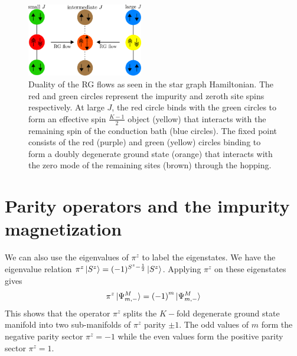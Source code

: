 \documentclass[12pt]{revtex4-2}
\begin{document}
\begin{figure}[htpb]
	\centering
	\includegraphics[width=0.45\textwidth]{./duality.pdf}
	\caption{Duality of the RG flows as seen in the star graph Hamiltonian. The red and green circles represent the impurity and zeroth site spins respectively. At large \(J\), the red circle binds with the green circles to form an effective spin \(\frac{K-1}{2}\) object (yellow) that interacts with the remaining spin of the conduction bath (blue circles). The fixed point consists of the red (purple) and green (yellow) circles binding to form a doubly degenerate ground state (orange) that interacts with the zero mode of the remaining sites (brown) through the hopping.}
	\label{duality_fig}
\end{figure}

\section{Parity operators and the impurity magnetization}
We can also use the eigenvalues of \(\pi^z\) to label the eigenstates. We have the eigenvalue relation \(\pi^z \ket{S^z} = (-1)^{S^z - \frac{1}{2}}\ket{S^z}\). Applying \(\pi^z\) on these eigenstates gives
\begin{align}
	\pi^z\ket{\Psi^M_{m,-}} = \left( -1 \right) ^{m}\ket{\Psi^M_{m,-}}
\end{align}
This shows that the operator \(\pi^z\) splits the \(K-\)fold degenerate ground state manifold into two sub-manifolds of \(\pi^z\) parity \(\pm 1\). The odd values of \(m\) form the negative parity sector \(\pi^z = -1\) while the even values form the positive parity sector \(\pi^z = 1\).
\end{document}
